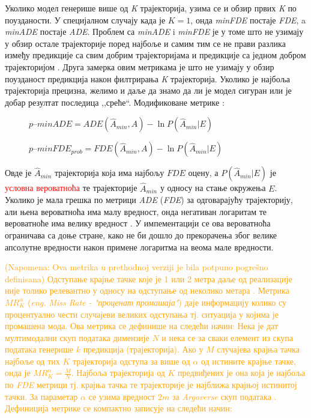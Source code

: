 \documentclass[11pt,oneside]{memoir}
\begin{document}
Уколико модел генерише више од \textit{K} трајекторија, узима се и обзир првих \textit{K} по поузданости. У специјалном случају када је $K = 1$, онда 
\textit{minFDE} постаје \textit{FDE}, a \textit{minADE} постаје \textit{ADE}. 
Проблем са \textit{minADE} i \textit{minFDE} је у томе што не узимају у обзир остале трајекторије поред најбоље и самим тим се не прави разлика
између предикције са свим добрим трајекторијама и предикције са једном добром трајекторијом \cite{Disdis}. 
Друга замерка овим метрикама је што не узимају у обзир поузданост предикција након филтрирања \textit{K} трајекторија. Уколико је најбоља трајекторија
прецизна, желимо и даље да знамо да ли је модел сигуран или је добар резултат последица ,,среће``. Модификоване метрике \cite{home}: 

\begin{figure}[H]
  \centering
  $p\mbox{--}minADE = ADE(\hat{A}_{min}, A) - \ln{P(\hat{A}_{min}|E)}$
\end{figure}

\begin{figure}[H]
  \centering
  $p\mbox{--}minFDE_{prob} = FDE(\hat{A}_{min}, A) - \ln{P(\hat{A}_{min}|E)}$
\end{figure}

Овде је $\hat{A}_{min}$ трајекторија која има најбољу $FDE$ оцену, а $P(\hat{A}_{min}|E)$ је \textcolor{red}{условна вероватноћа} те 
трајекторије $\hat{A}_{min}$ у односу на стање окружења $E$. Уколико је мала грешка по метрици \textit{ADE} (\textit{FDE}) за одговарајућу трајекторију, 
али њена вероватноћа има малу вредност, онда негативан логаритам те вероватноће има велику вредност \cite{argoverse}.
У импементацији се ова вероватноћа ограничава са доње стране, како не
би дошло до прекорачења због велике апсолутне вредности након примене логаритма на веома мале вредности.

\textcolor{orange}{(Napomena: Ova metrika u prethodnoj verziji je bila potpuno pogrešno definisana)
Одступање крајње тачке које је 1 или 2 метра даље од реализације није толико релевантно у односу на одступање од 
неколико метара \cite{home}. Метрика $MR^{\alpha}_{K}$ (\textit{eng. Miss Rate - "проценат промашаја"}) даје информацију
колико су процентуално чести случајеви великих одступања тј. ситуација у којима је промашена мода. Ова метрика се дефинише на следећи начин: 
Нека је дат мултимодални скуп података димензије $N$ и нека се за сваки елемент из скупа података генерише $k$ предикција (трајекторија). Ако
у $M$ случајева крајња тачка најбоље од тих $K$ трајекторија одступа за више од $\alpha$ од истините крајње тачке, 
онда је $MR^{\alpha}_{K} = \frac{M}{N}$. Најбоља трајекторија од $K$ предвиђених је она која је најбоља по \textit{FDE} метрици тј.
крајња тачка те трајекторије је најближа крајњој истинитој тачки. За параметар $\alpha$ се узима вредност $2m$ за \textit{Argoverse} 
скуп података \cite{argoverse}. Дефиниција метрике се компактно записује на следећи начин:
}
\end{document}

